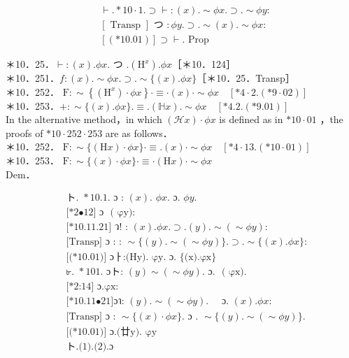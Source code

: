 \documentclass[10pt]{article}
\begin{document}
$$
\begin{aligned}
& \vdash . * 10 \cdot 1 . \supset \vdash:(x) . \sim \phi x . \supset . \sim \phi y: \\
& {[\text { Transp }] \text { つ }: \phi y . \supset . \sim(x) . \sim \phi x:} \\
& {[(* 10.01)] \supset \vdash . \text { Prop }}
\end{aligned}
$$

＊10．25．$\vdash:(x) . \phi x$. つ $.\left(\mathrm{H}^{x}\right) . \phi x$［＊10．124］\\
＊10．251．$f:(x) . \sim \phi x . \supset . \sim\{(x) . \phi x\}$［＊10．25．Transp］\\
＊10．252． $\mathrm{F}: \sim\left\{\left(\mathrm{H}^{x}\right) \cdot \phi x\right\} \cdot \equiv \cdot(x) \cdot \sim \phi x \quad[* 4 \cdot 2 .(* 9 \cdot 02)]$\\
＊10．253．$+: \sim\{(x) . \phi x\} . \equiv .(\mathbb{H} x) . \sim \phi x \quad[* 4.2 .(* 9.01)]$\\
In the alternative method，in which $(\mathcal{H} x) \cdot \phi x$ is defined as in $* 10 \cdot 01$ ，the proofs of $* 10 \cdot 252 \cdot 253$ are as follows．\\
＊10．252． $\mathrm{F}: \sim\{(\mathrm{H} x) \cdot \phi x\} \cdot \equiv .(x) \cdot \sim \phi x \quad[* 4 \cdot 13 .(* 10 \cdot 01)]$\\
＊10．253． $\mathrm{F}: \sim\{(x) \cdot \phi x\} \cdot \equiv \cdot(\mathrm{H} x) \cdot \sim \phi x$\\
Dem．


\begin{align*}
& \text { ト. } * 10 \text {.1. ɔ : }(x) \text {. } \phi x \text {. ɔ. } \phi y \text {. } \\
& \text { [*2•12] ɔ~~(~φy): } \\
& \text { [*10.11.21] ว! : }(x) . \phi x . \supset .(y) . \sim(\sim \phi y): \\
& \text { [Transp] ɔ : : } \sim\{(y) . \sim(\sim \phi y)\} . \supset . \sim\{(x) . \phi x\}: \\
& \text { [(*10.01)] ɔㅏ:(Hy).~φy. ɔ.~\{(x).φx\} }  \tag{1}\\
& \text { ৮. } * 101 \text {. ɔト: }(y) \sim(\sim \phi y) \text {. ɔ.~ (~φx). } \\
& \text { [*2:14] ɔ.φx: } \\
& \text { [*10.11•21]ɔา: }(y) . \sim(\sim \phi y) . \quad \text { ɔ. }(x) . \phi x: \\
& \text { [Transp] ɔ : } \sim\{(x) \cdot \phi x\} \text {. ɔ . } \sim\{(y) . \sim(\sim \phi y)\} \text {. } \\
& \text { [(*10.01)] ɔ.(廿y).~φy }  \tag{2}\\
& \text { ト.(1).(2).ɔ }
\end{align*}
\end{document}
